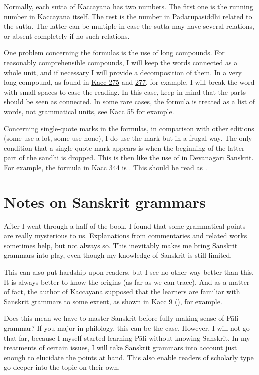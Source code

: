 Normally, each sutta of Kaccāyana has two numbers. The first one is the running number in Kaccāyana itself. The rest is the number in Padarūpasiddhi related to the sutta. The latter can be multiple in case the sutta may have several relations, or absent completely if no such relations.

One problem concerning the formulas is the use of long compounds. For reasonably comprehensible compounds, I will keep the words connected as a whole unit, and if necessary I will provide a decomposition of them. In a very long compound, as found in \hyperref[sut:275]{Kacc 275} and \hyperref[sut:277]{277}, for example, I will break the word with small spaces to ease the reading. In this case, keep in mind that the parts should be seen as connected. In some rare cases, the formula is treated as a list of words, not grammatical units, see \hyperref[sut:55]{Kacc 55} for example.

Concerning single-quote marks in the formulas, in comparison with other editions (some use a lot, some use none), I do use the mark but in a frugal way. The only condition that a single-quote mark appears is when the beginning  of the latter part of the sandhi is dropped. This is then like the use of  in Devanāgarī Sanskrit. For example, the formula in \hyperref[sut:344]{Kacc 344} is . This should be read as .

\section*{Notes on Sanskrit grammars}

After I went through a half of the book, I found that some grammatical points are really mysterious to us. Explanations from commentaries and related works sometimes help, but not always so. This inevitably makes me bring Sanskrit grammars into play, even though my knowledge of Sanskrit is still limited.

This can also put hardship upon readers, but I see no other way better than this. It is always better to know the origins (as far as we can trace). And as a matter of fact, the author of Kaccāyana supposed that the learners are familiar with Sanskrit grammars to some extent, as shown in \hyperref[sut:9]{Kacc 9} (), for example.

Does this mean we have to master Sanskrit before fully making sense of Pāli grammar? If you major in philology, this can be the case. However, I will not go that far, because I myself started learning Pāli without knowing Sanskrit. In my treatments of certain issues, I will take Sanskrit grammars into account just enough to elucidate the points at hand. This also enable readers of scholarly type go deeper into the topic on their own.

